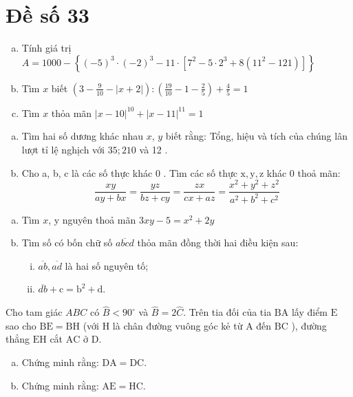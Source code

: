 \onehalfspacing
\section{Đề số 33}

\begin{bt} 
	\hfill
	\begin{enumerate}[a.]
		\item Tính giá trị $A=1000-\left\{(-5)^3 \cdot(-2)^3-11 \cdot\left[7^2-5 \cdot 2^3+8\left(11^2-121\right)\right]\right\}$
		\item Tìm $x$ biết $\left(3-\frac{9}{10}-|x+2|\right):\left(\frac{19}{10}-1-\frac{2}{5}\right)+\frac{4}{5}=1$
		\item Tìm $x$ thỏa mãn $|x-10|^{10}+|x-11|^{11}=1$
	\end{enumerate}
	\loigiai{} 
\end{bt}

\begin{bt}
	\hfill
	\begin{enumerate}[a.]
		\item Tìm hai số dương khác nhau $x$, $y$ biết rằng: Tổng, hiệu và tích của chúng lân lượt tỉ lệ nghịch với $35 ; 210$ và 12 .
		\item Cho a, b, c là các số thực khác 0 . Tìm các số thực $\mathrm{x}, \mathrm{y}, \mathrm{z}$ khác 0 thoả mãn:
		$$
		\frac{x y}{a y+b x}=\frac{y z}{b z+c y}=\frac{z x}{c x+a z}=\frac{x^2+y^2+z^2}{a^2+b^2+c^2}
		$$
	\end{enumerate}
	\loigiai{} 
\end{bt}

\begin{bt}
	\hfill 
	\begin{enumerate}[a.]
		\item Tìm $x$, y nguyên thoả mãn $3 x y-5=x^2+2 y$
		\item Tìm số có bốn chữ số $\overline{a b c d}$ thỏa mãn đồng thời hai điều kiện sau:
		\begin{enumerate}[i.]
			\item $\overline{a b}, \overline{a d}$ là hai số nguyên tố;
			\item $\overline{d b}+\mathrm{c}=\mathrm{b}^2+\mathrm{d}$.
		\end{enumerate}
	\end{enumerate}
	\loigiai{} 
\end{bt}

\begin{bt}
	Cho tam giác $A B C$ có $\hat{B}<90^{\circ}$ và $\hat{B}=2 \hat{C}$. Trên tia đối của tia $\mathrm{BA}$ lấy điểm $\mathrm{E}$ sao cho $\mathrm{BE}=\mathrm{BH}$ (với $\mathrm{H}$ là chân đường vuông góc kẻ từ $\mathrm{A}$ đến $\mathrm{BC}$ ), đường thẳng $\mathrm{EH}$ cắt $\mathrm{AC}$ ở $\mathrm{D}$.
	\begin{enumerate}[a.]
		\item Chứng minh rằng: $\mathrm{DA}=\mathrm{DC}$.
		\item Chứng minh rằng: $\mathrm{AE}=\mathrm{HC}$.
	\end{enumerate}
	\loigiai{}
\end{bt}
